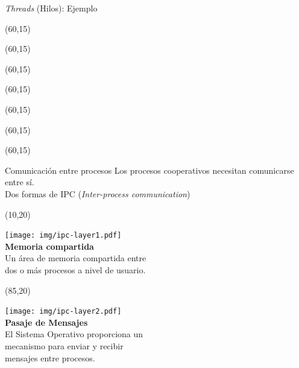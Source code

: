 \documentclass[aspectratio=169]{beamer}
\begin{document}
\begin{frame}[t]{\emph{Threads} (Hilos): Ejemplo}
    \begin{textblock}{70}(60,15)  \end{textblock} %
    \begin{textblock}{70}(60,15)   \end{textblock} %
    \begin{textblock}{70}(60,15)   \end{textblock} %
    \begin{textblock}{70}(60,15)   \end{textblock} %
    \begin{textblock}{70}(60,15)   \end{textblock} %
    \begin{textblock}{70}(60,15)   \end{textblock} %
    \begin{textblock}{70}(60,15)   \end{textblock} %
\end{frame}

\begin{frame}[t]{Comunicación entre procesos}
    \small
    Los procesos cooperativos necesitan comunicarse entre sí.\\
    Dos formas de IPC (\emph{Inter-process communication})
    \begin{textblock}{65}(10,20)
    \begin{center}
    \texttt{[image: img/ipc-layer1.pdf]}\\
    \textbf{Memoria compartida}\\
    \vspace{0.2cm} \small
    Un área de memoria compartida entre\\ dos o más procesos a nivel de usuario.
    \end{center}
    \end{textblock}
    \begin{textblock}{65}(85,20)
    \begin{center}
    \texttt{[image: img/ipc-layer2.pdf]}\\
    \textbf{Pasaje de Mensajes}\\
    \vspace{0.2cm} \small
    El Sistema Operativo proporciona un\\ mecanismo para enviar y recibir\\ mensajes entre procesos.
    \end{center}
    \end{textblock}
\end{frame}
\end{document}
